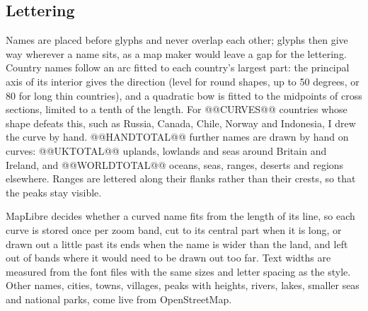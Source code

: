\documentclass[11pt,a4paper]{article}
\begin{document}
\subsection{Lettering}
Names are placed before glyphs and never overlap each other; glyphs then give way wherever a name sits, as a map maker would leave a gap for the lettering. Country names follow an arc fitted to each country's largest part: the principal axis of its interior gives the direction (level for round shapes, up to 50 degrees, or 80 for long thin countries), and a quadratic bow is fitted to the midpoints of cross sections, limited to a tenth of the length. For @@CURVES@@ countries whose shape defeats this, such as Russia, Canada, Chile, Norway and Indonesia, I drew the curve by hand. @@HANDTOTAL@@ further names are drawn by hand on curves: @@UKTOTAL@@ uplands, lowlands and seas around Britain and Ireland, and @@WORLDTOTAL@@ oceans, seas, ranges, deserts and regions elsewhere. Ranges are lettered along their flanks rather than their crests, so that the peaks stay visible.

MapLibre decides whether a curved name fits from the length of its line, so each curve is stored once per zoom band, cut to its central part when it is long, or drawn out a little past its ends when the name is wider than the land, and left out of bands where it would need to be drawn out too far. Text widths are measured from the font files with the same sizes and letter spacing as the style. Other names, cities, towns, villages, peaks with heights, rivers, lakes, smaller seas and national parks, come live from OpenStreetMap.
\end{document}
